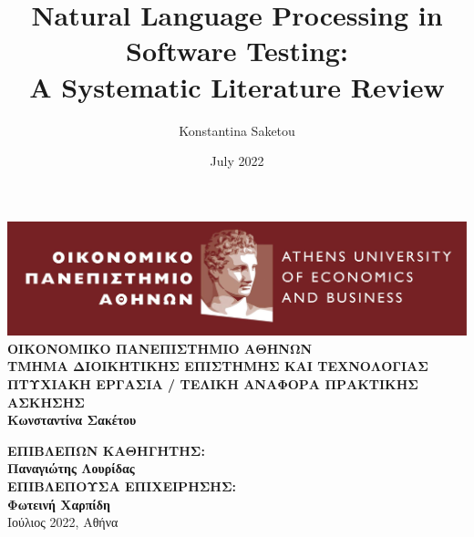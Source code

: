 \documentclass[11pt, notitlepage]{report}
\title{Natural Language Processing in Software Testing:\\ A Systematic Literature Review}
\author{\Large Konstantina Saketou}
\date{July 2022}
\begin{document}
  \begin{titlepage}
    \centering
    \includegraphics[width=17cm]{images/aueb_logo.jpg}
    \vfill
    {\bfseries\Large
        ΟΙΚΟΝΟΜΙΚΟ ΠΑΝΕΠΙΣΤΗΜΙΟ ΑΘΗΝΩΝ\\
        \vskip0.5cm
        ΤΜΗΜΑ ΔΙΟΙΚΗΤΙΚΗΣ ΕΠΙΣΤΗΜΗΣ ΚΑΙ ΤΕΧΝΟΛΟΓΙΑΣ\\
        \vskip0.5cm
        ΠΤΥΧΙΑΚΗ ΕΡΓΑΣΙΑ / ΤΕΛΙΚΗ ΑΝΑΦΟΡΑ ΠΡΑΚΤΙΚΗΣ ΑΣΚΗΣΗΣ\\
        
    }       
    \vfill
    {\bfseries\Large        
        Κωνσταντίνα Σακέτου\\
    } 
    
    \vfill{\bfseries\Large  
      ΕΠΙΒΛΕΠΩΝ ΚΑΘΗΓΗΤΗΣ:\\
      Παναγιώτης Λουρίδας\\ 
      \vskip1cm
      ΕΠΙΒΛΕΠΟΥΣΑ ΕΠΙΧΕΙΡΗΣΗΣ:\\
      Φωτεινή Χαρπίδη\\
    } 
    \vfill{\normalsize Ιούλιος 2022, Αθήνα}
  \end{titlepage}


\nocite{*}




\end{document}
